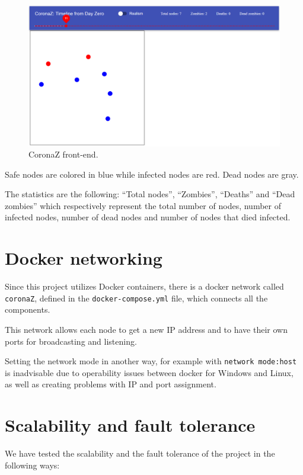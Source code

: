 \documentclass[conference]{IEEEtran}
\begin{document}
		\begin{figure}[htbp]
			\centerline{\includegraphics[width=\linewidth]{img/frontend.png}}
			\caption{CoronaZ front-end.}
			\label{fig:front-end}
		\end{figure}
	
		Safe nodes are colored in blue while infected nodes are red. Dead nodes are gray. 
		
		The statistics are the following: ``Total nodes'', ``Zombies'', ``Deaths'' and ``Dead zombies'' which respectively represent the total number of nodes, number of infected nodes, number of dead nodes and number of nodes that died infected.
		
	
\section{Docker networking}\label{sec:network}

	Since this project utilizes Docker containers, there is a docker network called \texttt{coronaZ}, defined in the \texttt{docker-compose.yml} file, which connects all the components.
	
	This network allows each node to get a new IP address and to have their own ports for broadcasting and listening.
	
	Setting the network mode in another way, for example with \texttt{network mode:host} is inadvisable due to operability issues between docker for Windows and Linux, as well as creating problems with IP and port assignment.
	
\section{Scalability and fault tolerance}\label{sec:scalability}

	We have tested the scalability and the fault tolerance of the project in the following ways:
	
\end{document}
